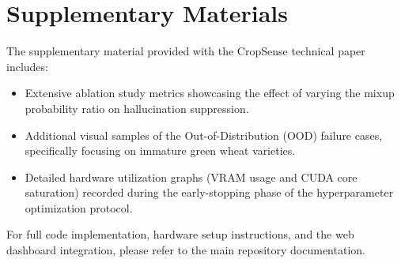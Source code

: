 \clearpage
\setcounter{page}{1}
\maketitlesupplementary

\section{Supplementary Materials}
\label{sec:suppl}
% 
The supplementary material provided with the CropSense technical paper includes:
% 
\begin{itemize}
\item Extensive ablation study metrics showcasing the effect of varying the mixup probability ratio on hallucination suppression.
\item Additional visual samples of the Out-of-Distribution (OOD) failure cases, specifically focusing on immature green wheat varieties.
\item Detailed hardware utilization graphs (VRAM usage and CUDA core saturation) recorded during the early-stopping phase of the hyperparameter optimization protocol.
\end{itemize}
% 
For full code implementation, hardware setup instructions, and the web dashboard integration, please refer to the main repository documentation.